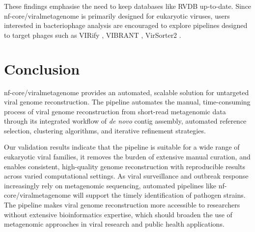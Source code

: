 These findings emphasise the need to keep databases like RVDB \citep{Chin2025-fd} up-to-date. Since nf-core/viralmetagenome is primarily designed for eukaryotic viruses, users interested in bacteriophage analysis are encouraged to explore pipelines designed to target phages such as VIRify \citep{Rangel-Pineros2022-wv}, VIBRANT \citep{Kieft2020-aq}, VirSorter2 \citep{Guo2021-rf}.

\section{Conclusion}
nf-core/viralmetagenome provides an automated, scalable solution for untargeted viral genome reconstruction. The pipeline automates the manual, time-consuming process of viral genome reconstruction from short-read metagenomic data through its integrated workflow of \textit{de novo} contig assembly, automated reference selection, clustering algorithms, and iterative refinement strategies.

Our validation results indicate that the pipeline is suitable for a wide range of eukaryotic viral families, it removes the burden of extensive manual curation, and enables consistent, high-quality genome reconstruction with reproducible results across varied computational settings.
As viral surveillance and outbreak response increasingly rely on metagenomic sequencing, automated pipelines like nf-core/viralmetagenome will support the timely identification of pathogen strains. The pipeline makes viral genome reconstruction more accessible to researchers without extensive bioinformatics expertise, which should broaden the use of metagenomic approaches in viral research and public health applications.


